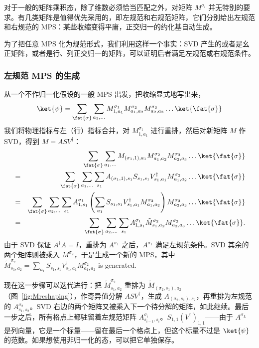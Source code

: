 对于一般的矩阵乘积态，除了维数必须恰当匹配之外，对矩阵 $M^{\sigma_i}$ 并无特别的要求。有几类矩阵是值得优先采用的，即左规范和右规范矩阵，它们分别给出左规范和右规范的 MPS：某些收缩变得平庸，正交归一的约化基自动生成。

为了把任意 MPS 化为规范形式，我们利用这样一个事实：SVD 产生的或者是幺正矩阵，或者是行、列正交归一的矩阵，可以证明后者满足左规范或右规范条件。

\subsubsection{左规范 MPS 的生成}
从一个不作归一化假设的一般 MPS 出发，把收缩显式地写出来，
\begin{equation}
\ket{\psi}= \sum_{\fat{\sigma}} \sum_{a_1,\ldots} M^{\sigma_ 1}_{1,a_1} M^{\sigma_2}_{a_1,a_2} M^{\sigma_3}_{a_2,a_3} \ldots \ket{\fat{\sigma}}
\end{equation}
我们将物理指标与左（行）指标合并，对 $M^{\sigma_ 1}_{1,a_1}$ 进行重排，然后对新矩阵 $M$ 作 SVD，得到 $M=ASV^\dagger$：
\begin{eqnarray}
& & \sum_{\fat{\sigma}} \sum_{a_1,\ldots} M_{(\sigma_ 1,1),a_1} M^{\sigma_2}_{a_1,a_2} M^{\sigma_3}_{a_2,a_3} \ldots \ket{\fat{\sigma}} \nonumber \\
&=&  \sum_{\fat{\sigma}} \sum_{a_1,\ldots} \sum_{s_1} A_{(\sigma_ 1,1),s_1} S_{s_1,s_1} V^\dagger_{s_1,a_1}  M^{\sigma_2}_{a_1,a_2}  \ldots \ket{\fat{\sigma}} \nonumber \\
&=& \sum_{\fat{\sigma}} \sum_{a_2,\ldots} \sum_{s_1} A^{\sigma_1}_{1,s_1} \left( \sum_{a_1} S_{s_1,s_1} V^\dagger_{s_1,a_1}  M^{\sigma_2}_{a_1,a_2} \right) M^{\sigma_3}_{a_2,a_3} \ldots \ket{\fat{\sigma}} \nonumber \\
&=& \sum_{\fat{\sigma}} \sum_{a_2,\ldots} \sum_{s_1} A^{\sigma_1}_{1,s_1} \tilde{M}^{\sigma_2}_{s_1,a_2} M^{\sigma_3}_{a_2,a_3} \ldots \ket{\fat{\sigma}} .
\end{eqnarray}
由于 SVD 保证 $A^\dagger A = I$，重排为 $A^{\sigma_1}$ 之后，$A^{\sigma_1}$ 满足左规范条件。SVD 其余的两个矩阵则被乘入 $M^{\sigma_2}$，于是生成一个新的 MPS，其中
$\tilde{M}^{\sigma_2}_{s_1,a_2} = \sum_{a_1} S_{s_1,s_1} V^\dagger_{s_1,a_1}  M^{\sigma_2}_{a_1,a_2}$ is generated. 

现在这一步骤可以迭代进行：把 $\tilde{M}^{\sigma_2}_{s_1,a_2}$ 重排为 $\tilde{M}_{(\sigma_2,s_1),a_2}$（图~\ref{fig:Mreshaping}），作奇异值分解 $ASV^\dagger$，生成 $A_{(\sigma_2,s_1),s_2}$，再重排为左规范的 $A^{\sigma_2}_{s_1,s_2}$。SVD 右边的两个矩阵又被乘入下一个待分解的矩阵，如此继续。最后一步之后，所有格点上都驻留着左规范矩阵 $A^{\sigma_i}_{s_{i-1},s_i}$。$S_{1,1} (V^\dagger)_{1,1}$——由于 $A^{\sigma_L}$ 是列向量，它是一个标量——留在最后一个格点上，但这个标量不过是 $\ket{\psi}$ 的范数。如果想使用非归一化的态，可以把它单独保存。

